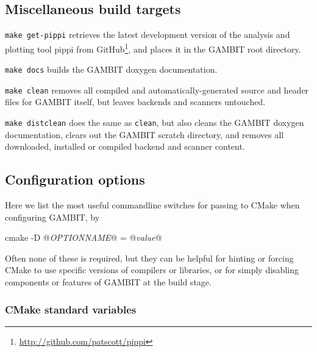 \documentclass[pdftex,twocolumn,epjc3_preprint,runningheads]{svjour3}
\renewcommand{\_}{\discretionary{\underscore}{}{\underscore}}
\newcommand\term[1]{{\lstset{style=terminal}\lstinline!#1!\lstset{style=cpp}}}
\newcommand{\metavarf}[1]{\textit{\color{darkgreen}\footnotesize\textrm{#1}}}
\newcommand{\metavar}{\metavarf}
\newcommand{\gambit}{\textsf{GAMBIT}\xspace}
\newcommand{\GB}{\gambit}
\newcommand\pippi{\textsf{pippi}\xspace}
\begin{document}
\subsection{Miscellaneous build targets}
\label{misc_build}
\begin{description}
\item \term{make get-pippi} retrieves the latest development version of the analysis and plotting tool \pippi \cite{pippi} from GitHub\footnote{\href{http://github.com/patscott/pippi}{http://github.com/patscott/pippi}}, and places it in the \GB root directory.
\item \term{make docs} builds the \GB doxygen documentation.
\item \term{make clean} removes all compiled and automatically-generated source and header files for \GB itself, but leaves backends and scanners untouched.
\item \term{make distclean} does the same as \term{clean}, but also cleans the \GB doxygen documentation, clears out the \GB scratch directory, and removes all downloaded, installed or compiled backend and scanner content.
\end{description}

\subsection{Configuration options}
\label{config_options}

Here we list the most useful commandline switches for passing to \textsf{CMake} when configuring \GB, by
\begin{lstterm}
cmake -D @\metavar{OPTION\_NAME}@ = @\metavar{value}@
\end{lstterm}
Often none of these is required, but they can be helpful for hinting or forcing \textsf{CMake} to use specific versions of compilers or libraries, or for simply disabling components or features of \GB at the build stage.

\subsubsection{\textsf{CMake} standard variables}
\end{document}
